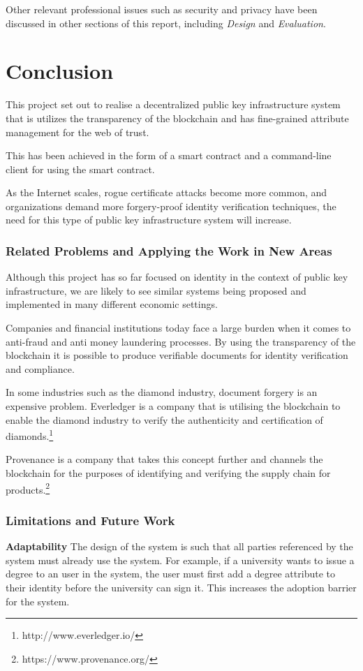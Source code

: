 \documentclass[12pt]{report}
\begin{document}
	Other relevant professional issues such as security and privacy have been discussed in other sections of this report, including \textit{Design} and \textit{Evaluation}.
	
	\chapter{Conclusion}
	This project set out to realise a decentralized public key infrastructure system that is utilizes the transparency of the blockchain and has fine-grained attribute management for the web of trust.
	
	This has been achieved in the form of a smart contract and a command-line client for using the smart contract.
	
	As the Internet scales, rogue certificate attacks become more common, and organizations demand more forgery-proof identity verification techniques, the need for this type of public key infrastructure system will increase.
	
	\subsection{Related Problems and Applying the Work in New Areas}
	Although this project has so far focused on identity in the context of public key infrastructure, we are likely to see similar systems being proposed and implemented in many different economic settings.
	
	Companies and financial institutions today face a large burden when it comes to anti-fraud and anti money laundering processes. By using the transparency of the blockchain it is possible to produce verifiable documents for identity verification and compliance.
	
	In some industries such as the diamond industry, document forgery is an expensive problem. Everledger is a company that is utilising the blockchain to enable the diamond industry to verify the authenticity and certification of diamonds.\footnote{http://www.everledger.io/}
	
	Provenance is a company that takes this concept further and channels the blockchain for the purposes of identifying and verifying the supply chain for products.\footnote{https://www.provenance.org/}
	
	\subsection{Limitations and Future Work}
	\bigskip
	\noindent \textbf{Adaptability}\newline
	The design of the system is such that all parties referenced by the system must already use the system. For example, if a university wants to issue a degree to an user in the system, the user must first add a degree attribute to their identity before the university can sign it. This increases the adoption barrier for the system.
	
\end{document}
